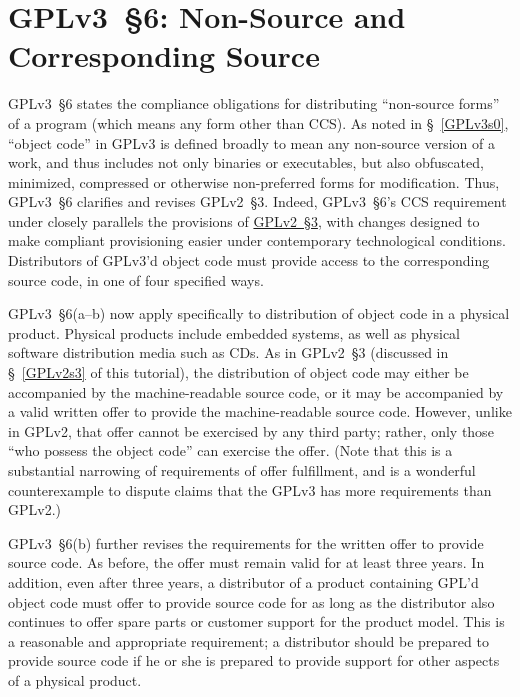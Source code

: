 \section{GPLv3~\S6: Non-Source and Corresponding Source}
\label{GPLv3s6}

GPLv3~\S6 states the compliance obligations for distributing ``non-source
forms'' of a program (which means any form other than CCS).  As noted in \S~\ref{GPLv3s0}, ``object code'' in GPLv3
is defined broadly to mean any non-source version of a work, and thus
includes not only binaries or executables, but also obfuscated, minimized, compressed or otherwise
non-preferred forms for modification.  Thus, GPLv3~\S6 clarifies and revises GPLv2~\S3.
Indeed, GPLv3~\S6's CCS requirement under
closely parallels the provisions of \hyperref[GPLv2s3]{GPLv2~\S3}, with changes
designed to make compliant provisioning easier under contemporary
technological conditions.  Distributors of GPLv3'd
object code must provide access to the corresponding source code, in one of
four specified ways.


GPLv3~\S6(a--b) now apply specifically to distribution of object code in a
physical product.  Physical products include embedded systems, as well as
physical software distribution media such as CDs.  As in GPLv2~\S3 (discussed
in \S~\ref{GPLv2s3} of this tutorial), the distribution of object code may
either be accompanied by the machine-readable source code, or it may be
accompanied by a valid written offer to provide the machine-readable source
code.  However, unlike in GPLv2, that offer cannot be exercised by any third
party; rather, only those ``who possess the object code'' can exercise
the offer.  (Note that this is a substantial narrowing of requirements of
offer fulfillment, and is a wonderful counterexample to dispute claims that
the GPLv3 has more requirements than GPLv2.)


GPLv3~\S6(b) further revises the requirements for the written offer to
provide source code. As before, the offer must remain valid for at least
three years. In addition, even after three years, a distributor of a product
containing GPL'd object code must offer to provide source code for as long as
the distributor also continues to offer spare parts or customer support for
the product model.  This is a reasonable and appropriate requirement; a
distributor should be prepared to provide source code if he or she is
prepared to provide support for other aspects of a physical product.


